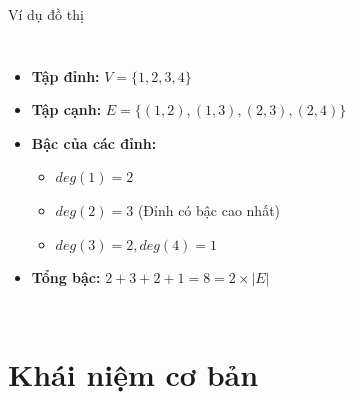 \documentclass{beamer}
\begin{document}
\begin{frame}{Ví dụ đồ thị}

\begin{columns}




\begin{itemize}
\item \textbf{Tập đỉnh:} $V = \{1, 2, 3, 4\}$
\item \textbf{Tập cạnh:} $E = \{(1,2), (1,3), (2,3), (2,4)\}$
\item \textbf{Bậc của các đỉnh:}
    \begin{itemize}
        \item $deg(1) = 2$
        \item $deg(2) = 3$ (Đỉnh có bậc cao nhất)
        \item $deg(3) = 2, deg(4) = 1$
    \end{itemize}
\item \textbf{Tổng bậc:} $2 + 3 + 2 + 1 = 8 = 2 \times |E|$
\end{itemize}

\end{columns}

\end{frame}

\section{Khái niệm cơ bản}
\end{document}
